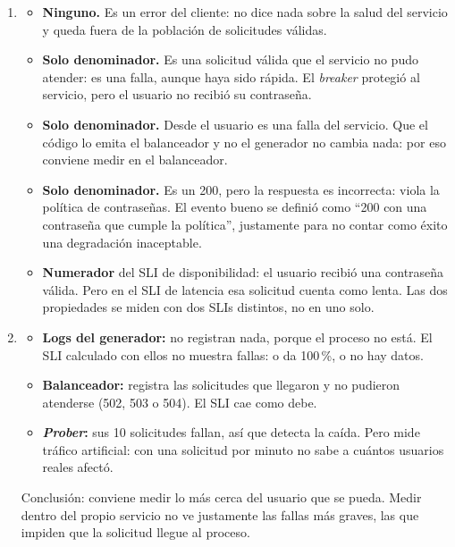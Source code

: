 \documentclass[variant=guia,cover=institutional,mode=screen]{ua-engineering-v6-article}
\begin{document}
\begin{uaanswer}
\begin{enumerate}
\item \begin{itemize}
\item[(a)] \textbf{Ninguno.} Es un error del cliente: no dice nada sobre la salud del servicio y queda fuera de la población de solicitudes válidas.
\item[(b)] \textbf{Solo denominador.} Es una solicitud válida que el servicio no pudo atender: es una falla, aunque haya sido rápida. El \emph{breaker} protegió al servicio, pero el usuario no recibió su contraseña.
\item[(c)] \textbf{Solo denominador.} Desde el usuario es una falla del servicio. Que el código lo emita el balanceador y no el generador no cambia nada: por eso conviene medir en el balanceador.
\item[(d)] \textbf{Solo denominador.} Es un 200, pero la respuesta es incorrecta: viola la política de contraseñas. El evento bueno se definió como ``200 con una contraseña que cumple la política'', justamente para no contar como éxito una degradación inaceptable.
\item[(e)] \textbf{Numerador} del SLI de disponibilidad: el usuario recibió una contraseña válida. Pero en el SLI de latencia esa solicitud cuenta como lenta. Las dos propiedades se miden con dos SLIs distintos, no en uno solo.
\end{itemize}
\item \begin{itemize}
\item \textbf{Logs del generador:} no registran nada, porque el proceso no está. El SLI calculado con ellos no muestra fallas: o da 100\,\%, o no hay datos.
\item \textbf{Balanceador:} registra las solicitudes que llegaron y no pudieron atenderse (502, 503 o 504). El SLI cae como debe.
\item \textbf{\emph{Prober}:} sus 10 solicitudes fallan, así que detecta la caída. Pero mide tráfico artificial: con una solicitud por minuto no sabe a cuántos usuarios reales afectó.
\end{itemize}
Conclusión: conviene medir lo más cerca del usuario que se pueda. Medir dentro del propio servicio no ve justamente las fallas más graves, las que impiden que la solicitud llegue al proceso.
\end{enumerate}
\end{uaanswer}
\end{document}
